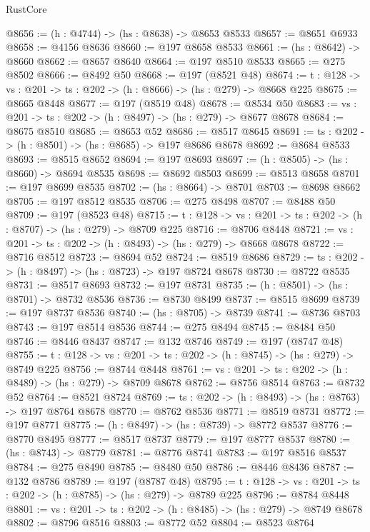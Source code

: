 \begin{lexlean}{RustCore}
\begin{coremodule}
@8656 := (h : @4744) -> (hs : @8638) -> @8653 @8533
@8657 := @8651 @6933
@8658 := @4156 @8636
@8660 := @197 @8658 @8533
@8661 := (hs : @8642) -> @8660
@8662 := @8657 @8640
@8664 := @197 @8510 @8533
@8665 := @275 @8502
@8666 := @8492 @50
@8668 := @197 (@8521 @48)
@8674 := {t : @128} -> {vs : @201} -> {ts : @202} -> (h : @8666) -> (hs : @279) -> @8668 @225
@8675 := @8665 @8448
@8677 := @197 (@8519 @48)
@8678 := @8534 @50
@8683 := {vs : @201} -> {ts : @202} -> (h : @8497) -> (hs : @279) -> @8677 @8678
@8684 := @8675 @8510
@8685 := @8653 @52
@8686 := @8517 @8645
@8691 := {ts : @202} -> (h : @8501) -> (hs : @8685) -> @197 @8686 @8678
@8692 := @8684 @8533
@8693 := @8515 @8652
@8694 := @197 @8693
@8697 := (h : @8505) -> (hs : @8660) -> @8694 @8535
@8698 := @8692 @8503
@8699 := @8513 @8658
@8701 := @197 @8699 @8535
@8702 := (hs : @8664) -> @8701
@8703 := @8698 @8662
@8705 := @197 @8512 @8535
@8706 := @275 @8498
@8707 := @8488 @50
@8709 := @197 (@8523 @48)
@8715 := {t : @128} -> {vs : @201} -> {ts : @202} -> (h : @8707) -> (hs : @279) -> @8709 @225
@8716 := @8706 @8448
@8721 := {vs : @201} -> {ts : @202} -> (h : @8493) -> (hs : @279) -> @8668 @8678
@8722 := @8716 @8512
@8723 := @8694 @52
@8724 := @8519 @8686
@8729 := {ts : @202} -> (h : @8497) -> (hs : @8723) -> @197 @8724 @8678
@8730 := @8722 @8535
@8731 := @8517 @8693
@8732 := @197 @8731
@8735 := (h : @8501) -> (hs : @8701) -> @8732 @8536
@8736 := @8730 @8499
@8737 := @8515 @8699
@8739 := @197 @8737 @8536
@8740 := (hs : @8705) -> @8739
@8741 := @8736 @8703
@8743 := @197 @8514 @8536
@8744 := @275 @8494
@8745 := @8484 @50
@8746 := @8446 @8437
@8747 := @132 @8746
@8749 := @197 (@8747 @48)
@8755 := {t : @128} -> {vs : @201} -> {ts : @202} -> (h : @8745) -> (hs : @279) -> @8749 @225
@8756 := @8744 @8448
@8761 := {vs : @201} -> {ts : @202} -> (h : @8489) -> (hs : @279) -> @8709 @8678
@8762 := @8756 @8514
@8763 := @8732 @52
@8764 := @8521 @8724
@8769 := {ts : @202} -> (h : @8493) -> (hs : @8763) -> @197 @8764 @8678
@8770 := @8762 @8536
@8771 := @8519 @8731
@8772 := @197 @8771
@8775 := (h : @8497) -> (hs : @8739) -> @8772 @8537
@8776 := @8770 @8495
@8777 := @8517 @8737
@8779 := @197 @8777 @8537
@8780 := (hs : @8743) -> @8779
@8781 := @8776 @8741
@8783 := @197 @8516 @8537
@8784 := @275 @8490
@8785 := @8480 @50
@8786 := @8446 @8436
@8787 := @132 @8786
@8789 := @197 (@8787 @48)
@8795 := {t : @128} -> {vs : @201} -> {ts : @202} -> (h : @8785) -> (hs : @279) -> @8789 @225
@8796 := @8784 @8448
@8801 := {vs : @201} -> {ts : @202} -> (h : @8485) -> (hs : @279) -> @8749 @8678
@8802 := @8796 @8516
@8803 := @8772 @52
@8804 := @8523 @8764

\end{coremodule}
\end{lexlean}
